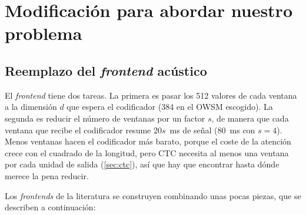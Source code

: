 \section{Modificación para abordar nuestro problema}

\subsection{Reemplazo del \textit{frontend} acústico}
\label{sec:frontend}
\label{sec:capa-sesion}

El \textit{frontend} tiene dos tareas. La primera es pasar los 512 valores de cada ventana a la dimensión $d$ que espera el codificador (384 en el OWSM escogido). La segunda es reducir el número de ventanas por un factor $s$, de manera que cada ventana que recibe el codificador resume $20s$~ms de señal (\SI{80}{\milli\second} con $s = 4$). Menos ventanas hacen el codificador más barato, porque el coste de la atención crece con el cuadrado de la longitud, pero CTC necesita al menos una ventana por cada unidad de salida (\cref{sec:ctc}), así que hay que encontrar hasta dónde merece la pena reducir.

Los \textit{frontends} de la literatura se construyen combinando unas pocas piezas, que se describen a continuación:

